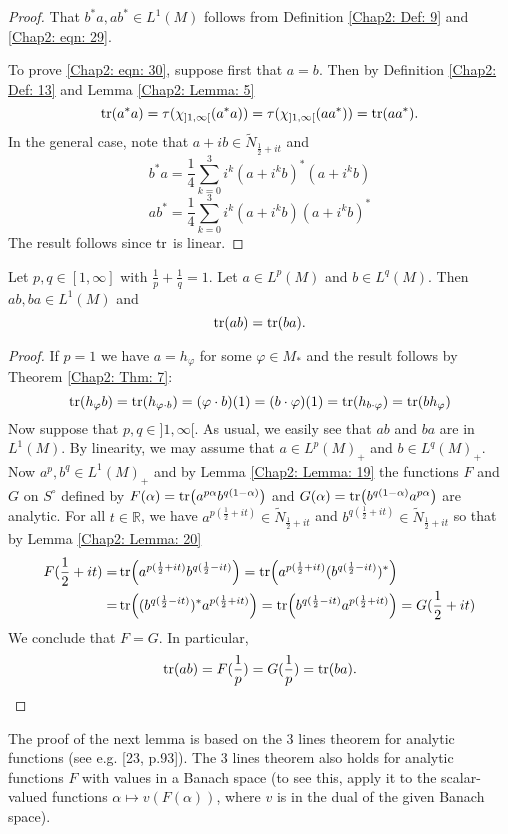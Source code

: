 \begin{proof}
    That $b^*a, ab^*\in L^1(M)$ follows from Definition \ref{Chap2: Def: 9} and \eqref{Chap2: eqn: 29}.\par
    To prove \eqref{Chap2: eqn: 30}, suppose first that $a=b$. Then by Definition \ref{Chap2: Def: 13} and Lemma \ref{Chap2: Lemma: 5}
    \[
        \tr(a^*a)=\tau(\chi_{]1,\infty[}(a^*a))=\tau(\chi_{]1,\infty[}(aa^*))=\tr(aa^*).
    \]
    In the general case, note that $a+ib\in \tilde{N}_{\frac{1}{2}+it}$ and
    \[
        b^*a=\frac{1}{4}\sum_{k=0}^3 i^k(a+i^kb)^*(a+i^kb)
    \]
    \[
        ab^*=\frac{1}{4}\sum_{k=0}^3 i^k(a+i^kb)(a+i^kb)^*
    \]
    The result follows since $\tr$ is linear.
\end{proof}
\begin{proposition}
    Let $p,q\in [1,\infty]$ with $\frac{1}{p}+\frac{1}{q}=1$. Let $a\in L^p(M)$ and $b\in L^q(M)$. Then $ab,ba\in L^1(M)$ and
    \[
        \tr(ab) = \tr(ba).
    \]
\end{proposition}
\begin{proof}
    If $p=1$ we have $a=h_\varphi$ for some $\varphi\in M_*$ and the result follows by Theorem \ref{Chap2: Thm: 7}:
    \[
        \tr(h_\varphi b)=\tr(h_{\varphi\cdot b})=(\varphi\cdot b)(1)=(b\cdot \varphi)(1)=\tr(h_{b\cdot\varphi})=\tr(bh_\varphi)
    \]
    Now suppose that $p,q\in ]1,\infty[$. As usual, we easily see that $ab$ and $ba$ are in $L^1(M)$. By linearity, we may assume that $a\in L^p(M)_+$ and $b\in L^q(M)_+$. Now $a^p,b^q\in L^1(M)_+$ and by Lemma \ref{Chap2: Lemma: 19} the functions $F$ and $G$ on $S^\circ$ defined by $F(\alpha)=\tr(a^{p\alpha}b^{q(1-\alpha)})$ and $G(\alpha)=\tr(b^{q(1-\alpha)}a^{p\alpha})$ are analytic. For all $t\in \mathbb{R}$, we have $a^{p(\frac{1}{2}+it)}\in\tilde{N}_{\frac{1}{2}+it}$ and $b^{q(\frac{1}{2}+it)}\in \tilde{N}_{\frac{1}{2}+it}$ so that by Lemma \ref{Chap2: Lemma: 20}
    \[
        \begin{split}
            F(\frac{1}{2}+it)=&\tr(a^{p(\frac{1}{2}+it)}b^{q(\frac{1}{2}-it)})=\tr(a^{p(\frac{1}{2}+it)}(b^{q(\frac{1}{2}-it)})^*)\\
            =&\tr((b^{q(\frac{1}{2}-it)})^*a^{p(\frac{1}{2}+it)})=\tr(b^{q(\frac{1}{2}-it)}a^{p(\frac{1}{2}+it)})=G(\frac{1}{2}+it)
        \end{split}
    \]
    We conclude that $F=G$. In particular,
    \[
        \tr(ab)=F(\frac{1}{p})=G(\frac{1}{p})=\tr(ba).
    \]
\end{proof}
The proof of the next lemma is based on the 3 lines theorem for analytic functions (see e.g. [23, p.93]). The 3 lines theorem also holds for analytic functions $F$ with values in a Banach space (to see this, apply it to the scalar-valued functions $\alpha\mapsto v(F(\alpha))$, where $v$ is in the dual of the given Banach space).
